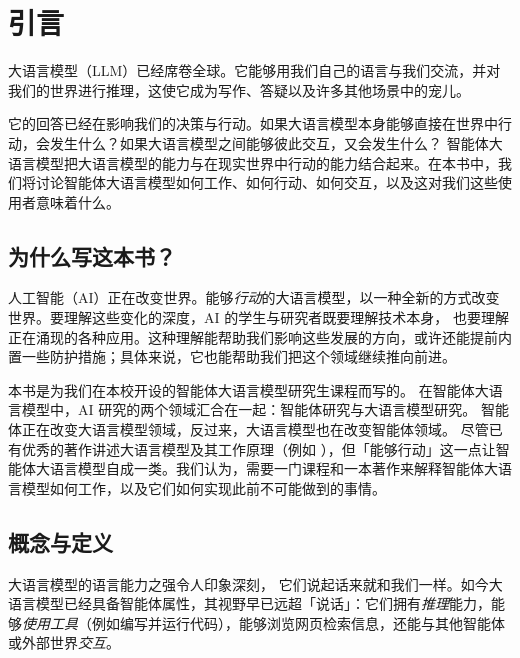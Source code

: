 \chapter{引言}\label{chap:intro}
大语言模型（LLM）已经席卷全球。它能够用我们自己的语言与我们交流，并对我们的世界进行推理，这使它成为写作、答疑以及许多其他场景中的宠儿。

它的回答已经在影响我们的决策与行动。如果大语言模型本身能够直接在世界中行动，会发生什么？如果大语言模型之间能够彼此交互，又会发生什么？
智能体大语言模型把大语言模型的能力与在现实世界中行动的能力结合起来。在本书中，我们将讨论智能体大语言模型如何工作、如何行动、如何交互，以及这对我们这些使用者意味着什么。

\section{为什么写这本书？}
人工智能（AI）正在改变世界。能够{\em 行动}的大语言模型，以一种全新的方式改变世界。要理解这些变化的深度，AI 的学生与研究者既要理解技术本身，%
也要理解正在涌现的各种应用。这种理解能帮助我们影响这些发展的方向，或许还能提前内置一些防护措施；具体来说，它也能帮助我们把这个领域继续推向前进。

本书是为我们在本校开设的智能体大语言模型研究生课程而写的。
在智能体大语言模型中，AI 研究的两个领域汇合在一起：智能体研究与大语言模型研究。
智能体正在改变大语言模型领域，反过来，大语言模型也在改变智能体领域。%
%
尽管已有优秀的著作讲述大语言模型及其工作原理（例如 \citet{jm3}），但「能够行动」这一点让智能体大语言模型自成一类。我们认为，需要一门课程和一本著作来解释智能体大语言模型如何工作，以及它们如何实现此前不可能做到的事情。

\section{概念与定义}
大语言模型的语言能力之强令人印象深刻， %
它们说起话来就和我们一样。如今大语言模型已经具备智能体属性，其视野早已远超「说话」：它们拥有{\em 推理}能力，能够{\em 使用工具}（例如编写并运行代码），能够浏览网页检索信息，还能与其他智能体或外部世界{\em 交互}。

